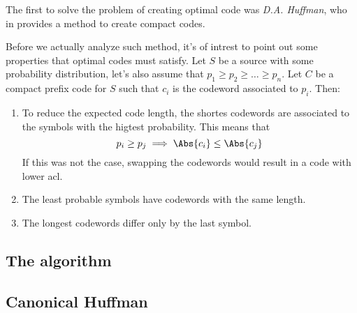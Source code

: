 \documentclass{subfiles}
\begin{document}
    The first to solve the problem of creating optimal code was \emph{D.A. Huffman},
       who in \cite{Huffman} provides a method to create compact codes.

        Before we actually analyze such method, 
            it's of intrest to point out some properties that optimal codes 
            must satisfy.
        Let \(S\) be a source with some probability distribution,
        let's also assume that \(p_{1} \ge p_{2} \ge \ldots \ge p_{n}\).
        Let \(C\) be a compact prefix code for \(S\) such that \(c_{i}\) is 
            the codeword associated to \(p_{i}\). Then:
        \begin{enumerate}
            \item To reduce the expected code length, 
                the shortes codewords are associated to the symbols with the higtest
                probability. This means that 
                \[
                   p_{i} \ge p_{j} \implies \Abs{c_{i}} \le \Abs{c_{j}}
                \]
                If this was not the case, 
                swapping the codewords would result in a code with lower \gls{acl}.

            \item The least probable symbols have codewords with the same length.
            \item The longest codewords differ only by the last symbol.
        \end{enumerate}

        \subsection{The algorithm}
        

        \subsection{Canonical Huffman}
        
\end{document}
